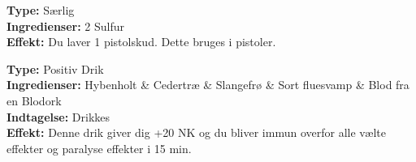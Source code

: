 \begin{særlig*}[Krudt]
\textbf{Type:} Særlig\\
\textbf{Ingredienser:} 2 Sulfur\\
\textbf{Effekt:} Du laver 1 pistolskud. Dette bruges i pistoler.\\
\end{særlig*}

\begin{drik*}
\textbf{Type:} Positiv Drik\\
\textbf{Ingredienser:} Hybenholt \& Cedertræ \& Slangefrø \& Sort fluesvamp \& Blod fra en Blodork\\
\textbf{Indtagelse:} Drikkes\\
\textbf{Effekt:} Denne drik giver dig +20 NK og du bliver immun overfor alle vælte effekter og paralyse effekter i 15 min.\\
\end{drik*}